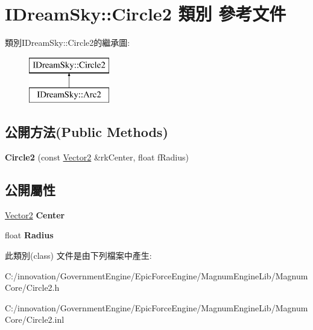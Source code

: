 \hypertarget{class_i_dream_sky_1_1_circle2}{}\section{I\+Dream\+Sky\+:\+:Circle2 類別 參考文件}
\label{class_i_dream_sky_1_1_circle2}
類別\+I\+Dream\+Sky\+:\+:Circle2的繼承圖\+:\begin{figure}[H]
\begin{center}
\leavevmode
\includegraphics[height=2.000000cm]{class_i_dream_sky_1_1_circle2}
\end{center}
\end{figure}
\subsection*{公開方法(Public Methods)}
\begin{DoxyCompactItemize}
\item 
{\bfseries Circle2} (const \hyperlink{class_i_dream_sky_1_1_vector2}{Vector2} \&rk\+Center, float f\+Radius)\hypertarget{class_i_dream_sky_1_1_circle2_aae69b9e0bf15500a7e3424c283e7b12a}{}\label{class_i_dream_sky_1_1_circle2_aae69b9e0bf15500a7e3424c283e7b12a}

\end{DoxyCompactItemize}
\subsection*{公開屬性}
\begin{DoxyCompactItemize}
\item 
\hyperlink{class_i_dream_sky_1_1_vector2}{Vector2} {\bfseries Center}\hypertarget{class_i_dream_sky_1_1_circle2_a628a7e5db7826a7bac518b6fa926491d}{}\label{class_i_dream_sky_1_1_circle2_a628a7e5db7826a7bac518b6fa926491d}

\item 
float {\bfseries Radius}\hypertarget{class_i_dream_sky_1_1_circle2_a827537ff3dd275984af7d25602cff514}{}\label{class_i_dream_sky_1_1_circle2_a827537ff3dd275984af7d25602cff514}

\end{DoxyCompactItemize}


此類別(class) 文件是由下列檔案中產生\+:\begin{DoxyCompactItemize}
\item 
C\+:/innovation/\+Government\+Engine/\+Epic\+Force\+Engine/\+Magnum\+Engine\+Lib/\+Magnum\+Core/Circle2.\+h\item 
C\+:/innovation/\+Government\+Engine/\+Epic\+Force\+Engine/\+Magnum\+Engine\+Lib/\+Magnum\+Core/Circle2.\+inl\end{DoxyCompactItemize}
